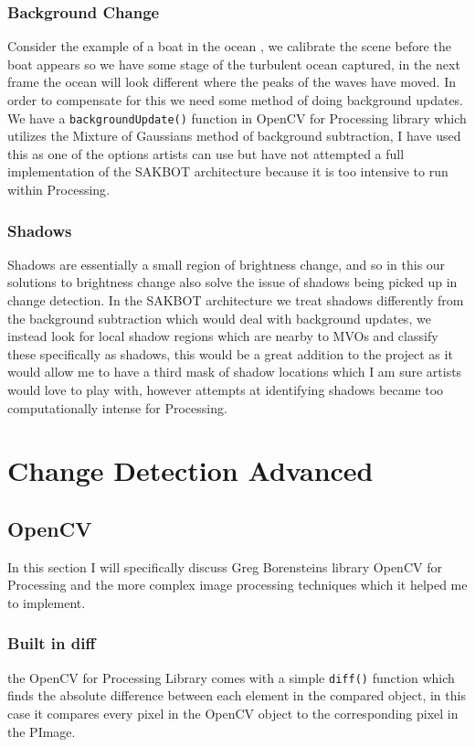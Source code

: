 \documentclass[a4paper]{report}
\begin{document}
\subsubsection{Background Change}
Consider the example of a boat in the ocean , we calibrate the scene before the boat appears so we have some stage of the turbulent ocean captured, in the next frame the ocean will look different where the peaks of the waves have moved. In order to compensate for this we need some method of doing background updates. We have a \verb|backgroundUpdate()| function in OpenCV for Processing library\cite{OPENCV} which utilizes the Mixture of Gaussians method of background subtraction, I have used this as one of the options artists can use but have not attempted a full implementation of the SAKBOT architecture\cite{SAKBOT} because it is too intensive to run within Processing\cite{PROCESSING}.

\subsubsection{Shadows}
Shadows are essentially a small region of brightness change, and so in this our solutions to brightness change also solve the issue of shadows being picked up in change detection. In the SAKBOT architecture\cite{SAKBOT} we treat shadows differently from the background subtraction which would deal with background updates, we instead look for local shadow regions which are nearby to MVOs and classify these specifically as shadows, this would be a great addition to the project as it would allow me to have a third mask of shadow locations which I am sure artists would love to play with, however attempts at identifying shadows became too computationally intense for Processing\cite{PROCESSING}.

\section{Change Detection Advanced}
\subsection{OpenCV}
In this section I will specifically discuss Greg Borensteins library OpenCV for Processing \cite{OPENCV} and the more complex image processing techniques which it helped me to implement.

\subsubsection{Built in diff}
the OpenCV for Processing Library comes with a simple \verb|diff()| function which finds the absolute difference between each element in the compared object, in this case it compares every pixel in the OpenCV object to the corresponding pixel in the PImage.
\end{document}
